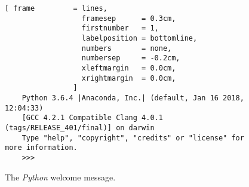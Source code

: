 \begin{figure}[!ht]
\centering
\begin{Verbatim}[ frame         = lines, 
                  framesep      = 0.3cm, 
                  firstnumber   = 1,
                  labelposition = bottomline,
                  numbers       = none,
                  numbersep     = -0.2cm,
                  xleftmargin   = 0.0cm,
                  xrightmargin  = 0.0cm,
                ]
    Python 3.6.4 |Anaconda, Inc.| (default, Jan 16 2018, 12:04:33) 
    [GCC 4.2.1 Compatible Clang 4.0.1 (tags/RELEASE_401/final)] on darwin
    Type "help", "copyright", "credits" or "license" for more information.
    >>> 
\end{Verbatim}
\vspace*{-0.3cm}
\caption{The \textsl{Python} welcome message.}
\label{fig:python}
\end{figure}

